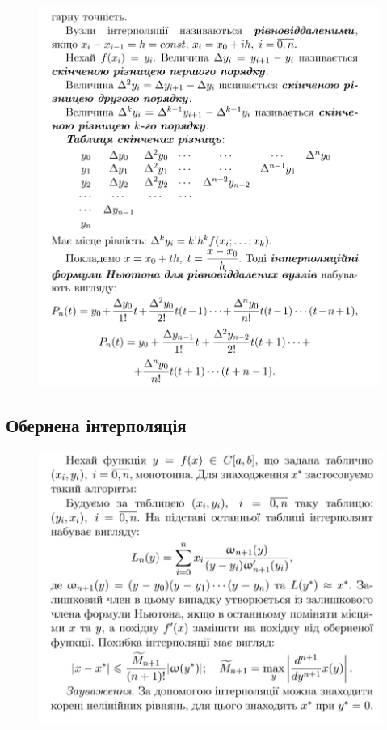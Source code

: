 \documentclass[a4paper, 12pt]{article}
\begin{document}
\begin{figure}[ht]
	\centering
	\includegraphics[width=0.8\linewidth]{./img/inter3.png}
\end{figure}
\clearpage
\newpage

\newpage

\subsection{Обернена інтерполяція}

\begin{figure}[ht]
	\centering
	\includegraphics[width=0.8\linewidth]{./img/rev_inter1.png}
\end{figure}
\end{document}
